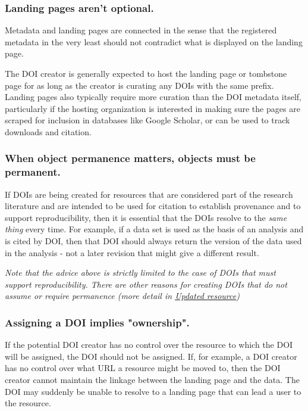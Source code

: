 \documentclass[11pt,a4paper]{ivoa}
\begin{document}
\subsubsection{Landing pages aren't optional.}\hypertarget{landing-pages-arent-optional}{}\label{sec:landing-pages-arent-optional}

Metadata and landing pages are connected in the sense that the registered metadata in the very least should not contradict what is displayed on the landing page.

The DOI creator is generally expected to host the landing page or tombstone page for as long as the creator is curating any DOIs with the same prefix. Landing pages also typically require more curation than the DOI metadata itself, particularly if the hosting organization is interested in making sure the pages are scraped for inclusion in databases like Google Scholar, or can be used to track downloads and citation.

\subsubsection{When object permanence matters, objects must be permanent.}\hypertarget{when-object-permanence-matters-objects-must-be-permanent}{}\label{sec:when-object-permanence-matters-objects-must-be-permanent}

If DOIs are being created for resources that are considered part of the research literature and are intended to be used for citation to establish provenance and to support reproducibility, then it is essential that the DOIs resolve to the \emph{same thing} every time. For example, if a data set is used as the basis of an analysis and is cited by DOI, then that DOI should always return the version of the data used in the analysis - not a later revision that might give a different result.

\emph{Note that the advice above is strictly limited to the case of DOIs that must support reproducibility. There are other reasons for creating DOIs that do not assume or require permanence (more detail in \hyperlink{updated-resources}{Updated resource})}

\subsubsection{Assigning a DOI implies "ownership".}\hypertarget{assigning-a-doi-implies-ownership}{}\label{sec:assigning-a-doi-implies-ownership}

If the potential DOI creator has no control over the resource to which the DOI will be assigned, the DOI should not be assigned. If, for example, a DOI creator has no control over what URL a resource might be moved to, then the DOI creator cannot maintain the linkage between the landing page and the data. The DOI may suddenly be unable to resolve to a landing page that can lead a user to the resource.
\end{document}
